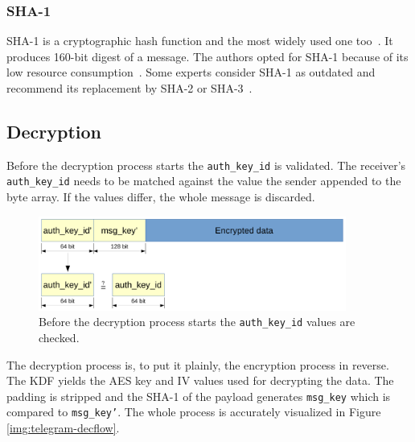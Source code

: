 \documentclass[thesis=M,english]{FITthesis}[2012/10/20]
\begin{document}
\subsubsection{SHA-1}

SHA-1 is a cryptographic hash function and the most widely used one too~\cite{understanding-crypto}. It produces 160-bit digest of a message. The authors opted for SHA-1 because of its low resource consumption~\cite{telegram-sha1}. Some experts consider SHA-1 as outdated and recommend its replacement by SHA-2 or SHA-3~\cite{telegram-sha1}.

\subsection{Decryption}\label{crypto-regular-dec}

Before the decryption process starts the \texttt{auth\_key\_id} is validated. The receiver's \texttt{auth\_key\_id} needs to be matched against the value the sender appended to the byte array. If the values differ, the whole message is discarded.

\begin{figure}[htb]
	\centering
	\includegraphics[width=0.9\textwidth]{mtproto-auth-key.pdf}
	\caption[Message acceptance check]{Before the decryption process starts the \texttt{auth\_key\_id} values are checked.}
	\label{img:crypto-regular-dec}
\end{figure}

The decryption process is, to put it plainly, the encryption process in reverse. The KDF yields the AES key and IV values used for decrypting the data. The padding is stripped and the SHA-1 of the payload generates \texttt{msg\_key} which is compared to \texttt{msg\_key'}. The whole process is accurately visualized in Figure \ref{img:telegram-decflow}.
\end{document}
